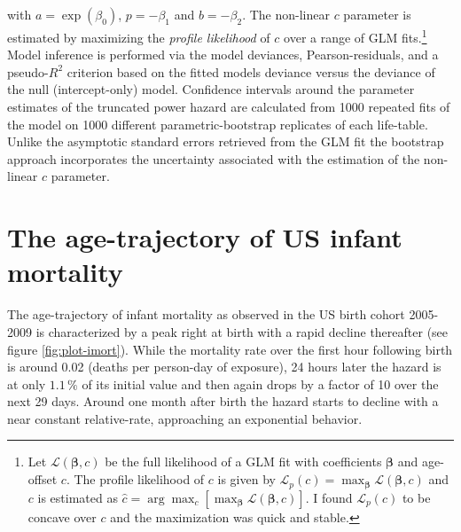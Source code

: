 \documentclass[smallextended]{svjour3} %
\begin{document}
with \(a = \exp(\beta_0)\), \(p=-\beta_1\) and \(b=-\beta_2\). The
non-linear \(c\) parameter is estimated by maximizing the \emph{profile
likelihood} \citep{Murphy2000} of \(c\) over a range of GLM
fits.\footnote{Let \(\mathcal{L}(\boldsymbol\beta,c)\) be the full
  likelihood of a GLM fit with coefficients \(\boldsymbol\beta\) and
  age-offset \(c\). The profile likelihood of \(c\) is given by
  \(\mathcal{L}_{p}(c) = \max_{\boldsymbol\beta} \mathcal{L}(\boldsymbol\beta,c)\)
  and \(c\) is estimated as
  \(\hat c = \arg\max_{c}[\max_{\boldsymbol\beta} \mathcal{L}(\boldsymbol\beta,c)]\).
  I found \(\mathcal{L}_{p}(c)\) to be concave over \(c\) and the
  maximization was quick and stable.} Model inference is performed via
the model deviances, Pearson-residuals, and a pseudo-\(R^2\) criterion
based on the fitted models deviance versus the deviance of the null
(intercept-only) model. Confidence intervals around the parameter
estimates of the truncated power hazard are calculated from 1000
repeated fits of the model on 1000 different parametric-bootstrap
replicates of each life-table. Unlike the asymptotic standard errors
retrieved from the GLM fit the bootstrap approach incorporates the
uncertainty associated with the estimation of the non-linear \(c\)
parameter.

\section*{The age-trajectory of US infant
mortality}\label{the-age-trajectory-of-us-infant-mortality}

The age-trajectory of infant mortality as observed in the US birth
cohort 2005-2009 is characterized by a peak right at birth with a rapid
decline thereafter (see figure \ref{fig:plot-imort}). While the
mortality rate over the first hour following birth is around 0.02
(deaths per person-day of exposure), 24 hours later the hazard is at
only \(1.1\,\%\) of its initial value and then again drops by a factor
of 10 over the next 29 days. Around one month after birth the hazard
starts to decline with a near constant relative-rate, approaching an
exponential behavior.
\end{document}
